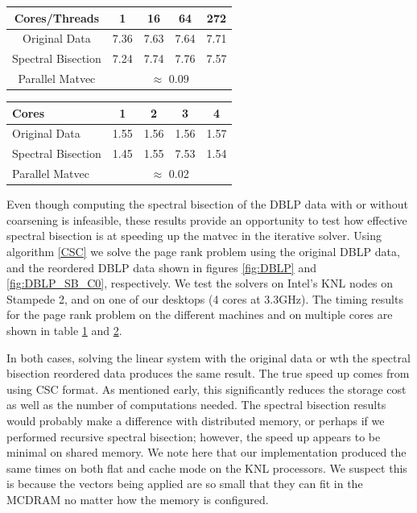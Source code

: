 \documentclass[11pt]{article}
\begin{document}
\begin{table}[h!]
	\centering
	\begin{tabular}[h]{|c||c|c|c|c|}
		\hline
		Cores/Threads& 1 & 16 & 64 & 272 \\
		\hline
		Original Data & 7.36 & 7.63 & 7.64 & 7.71\\
		Spectral Bisection & 7.24 & 7.74 & 7.76 & 7.57 \\
		\hline
		Parallel Matvec & \multicolumn{4}{|c|}{$\approx$ 0.09}\\
		\hline
	\end{tabular}
\label{tab:KNLTIME}
\end{table}

\begin{table}[h!]
	\centering
	\begin{tabular}[h]{|l||c|c|c|c|}
		\hline
		Cores & 1 & 2& 3 & 4 \\
		\hline
		Original Data & 1.55 & 1.56 & 1.56 & 1.57\\
		Spectral Bisection & 1.45 & 1.55 & 7.53 & 1.54 \\
		\hline
		Parallel Matvec & \multicolumn{4}{|c|}{$\approx$ 0.02}\\
		\hline
	\end{tabular}
\label{tab:ICESTIME}
\end{table}

Even though computing the spectral bisection of the DBLP data with or without
coarsening is infeasible, these results provide an opportunity to test how
effective spectral bisection is at speeding up the matvec in the iterative
solver. Using algorithm
\ref{CSC} we solve the page rank problem using the original DBLP data, and the
reordered DBLP data shown in figures \ref{fig:DBLP} and \ref{fig:DBLP_SB_C0},
respectively. We test the solvers on Intel's KNL nodes on Stampede 2, and on one
of our desktops (4 cores at 3.3GHz). The timing results for the page rank
problem on the different
machines and on multiple cores are shown in table \ref{tab:KNLTIME} and
\ref{tab:ICESTIME}.

In both cases, solving the linear system with the original data
or wth the spectral bisection reordered data produces the same result. The true
speed up comes from using CSC format. As mentioned early, this significantly
reduces the storage cost as well as the number of computations needed. The
spectral bisection results would probably make a difference with distributed
memory, or perhaps if we performed recursive spectral bisection; however, the
speed up appears to be minimal on shared memory. We note here that our
implementation produced the same times on both flat and cache mode on the KNL
processors. We suspect this is because the vectors being applied are so small
that they can fit in the MCDRAM no matter how the memory is configured.
\end{document}
